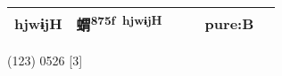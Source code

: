 \documentclass[14pt,a4paper]{scrartcl}
\begin{document}
\begin{longtable}[c]{@{}llllll@{}}
\begin{minipage}[t]{0.14\columnwidth}
hjwɨjH
\strut\end{minipage} &
\begin{minipage}[t]{0.14\columnwidth}\raggedright\strut
蝟\textsuperscript{875f~hjwɨjH}
\strut\end{minipage} &
\begin{minipage}[t]{0.14\columnwidth}\raggedright\strut
\strut\end{minipage} &
\begin{minipage}[t]{0.14\columnwidth}\raggedright\strut
\strut\end{minipage} &
\begin{minipage}[t]{0.14\columnwidth}\raggedright\strut
pure:B
\strut\end{minipage}\tabularnewline
\bottomrule
\end{longtable}

(123) 0526 {[}3{]}
\end{document}
